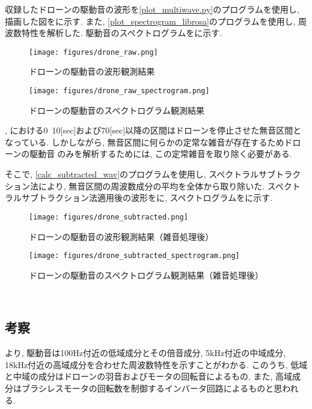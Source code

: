 収録したドローンの駆動音の波形を\ref{plot_multiwave.py}のプログラムを使用し, 描画した図をに示す. また, \ref{plot_spectrogram_librosa}のプログラムを使用し, 周波数特性を解析した. 駆動音のスペクトログラムをに示す. 

\begin{figure}[H]
\centering
\texttt{[image: figures/drone\_raw.png]}
\caption{ドローンの駆動音の波形観測結果}
\label{fig:drone_raw}
\end{figure}

\begin{figure}[H]
\centering
\texttt{[image: figures/drone\_raw\_spectrogram.png]}
\caption{ドローンの駆動音のスペクトログラム観測結果}
\label{fig:drone_raw_spectrogram}
\end{figure}

, における0~10[sec]および70[sec]以降の区間はドローンを停止させた無音区間となっている. しかしながら, 無音区間に何らかの定常な雑音が存在するためドローンの駆動音のみを解析するためには, この定常雑音を取り除く必要がある. 

そこで, \ref{calc_subtracted_wav}のプログラムを使用し, スペクトラルサブトラクション法\cite{spectral_subtraction}により, 無音区間の周波数成分の平均を全体から取り除いた. 
スペクトラルサブトラクション法適用後の波形をに, スペクトログラムをに示す. 

\begin{figure}[H]
\centering
\texttt{[image: figures/drone\_subtracted.png]}
\caption{ドローンの駆動音の波形観測結果（雑音処理後）}
\label{fig:drone_subtracted}
\end{figure}

\begin{figure}[H]
\centering
\texttt{[image: figures/drone\_subtracted\_spectrogram.png]}
\caption{ドローンの駆動音のスペクトログラム観測結果（雑音処理後）}
\label{fig:drone_subtracted_spectrogram}
\end{figure}


\
\subsection{考察}\label{consideration-drone}

より, 駆動音は100Hz付近の低域成分とその倍音成分, 5kHz付近の中域成分, 18kHz付近の高域成分を合わせた周波数特性を示すことがわかる. このうち, 低域と中域の成分はドローンの羽音およびモータの回転音によるもの, また, 高域成分はブラシレスモータの回転数を制御するインバータ回路によるものと思われる. 

